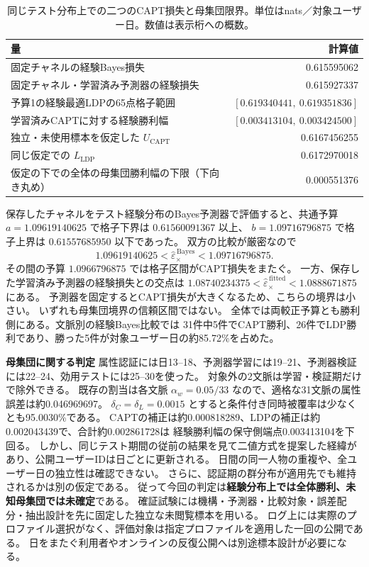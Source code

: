 \documentclass[a4paper,11pt]{ltjsarticle}
\theoremstyle{jp}
\newcommand{\para}[1]{\par\Needspace{3\baselineskip}\addvspace{.6\baselineskip}\noindent\textbf{#1}\enspace}
\begin{document}
\begin{table}[htbp]
\centering
\caption{同じテスト分布上での二つのCAPT損失と母集団限界。単位はnats／対象ユーザー日。数値は表示桁への概数。}\label{tab:audit}
\begin{tabular}{@{}lr@{}}
\toprule
量 & 計算値\\
\midrule
固定チャネルの経験Bayes損失 & 0.615595062\\
固定チャネル・学習済み予測器の経験損失 & 0.615927337\\
予算1の経験最適LDPの65点格子範囲 & \([0.619340441,\ 0.619351836]\)\\
学習済みCAPTに対する経験勝利幅 & \([0.003413104,\ 0.003424500]\)\\
\midrule
独立・未使用標本を仮定した \(U_{\mathrm{CAPT}}\) & 0.6167456255\\
同じ仮定での \(L_{\mathrm{LDP}}\) & 0.6172970018\\
仮定の下での全体の母集団勝利幅の下限（下向き丸め） & 0.000551376\\
\bottomrule
\end{tabular}
\end{table}

保存したチャネルをテスト経験分布のBayes予測器で評価すると、共通予算
\(a=1.09619140625\) で格子下界は \(0.61560091367\) 以上、
\(b=1.09716796875\) で格子上界は \(0.61557685950\) 以下であった。
双方の比較が厳密なので
\[
  \boxed{1.09619140625<\widehat\varepsilon_\times^{\,\mathrm{Bayes}}
                      <1.09716796875} .
\]
その間の予算 \(1.0966796875\) では格子区間がCAPT損失をまたぐ。
一方、保存した学習済み予測器の経験損失との交点は
\(1.08740234375<\widehat\varepsilon_\times^{\,\mathrm{fitted}}<1.0888671875\) にある。
予測器を固定するとCAPT損失が大きくなるため、こちらの境界は小さい。
いずれも母集団境界の信頼区間ではない。
全体では両較正予算とも勝利側にある。文脈別の経験Bayes比較では
31件中5件でCAPT勝利、26件でLDP勝利であり、勝った5件が対象ユーザー日の約85.72\%を占めた。

\para{母集団に関する判定}
属性認証には日13--18、予測器学習には19--21、予測器検証には22--24、効用テストには25--30を使った。
対象外の2文脈は学習・検証期だけで除外できる。
既存の割当は各文脈 \(\alpha_w=0.05/33\) なので、適格な31文脈の属性誤差は約0.046969697。
\(\delta_C=\delta_L=0.0015\) とすると条件付き同時被覆率は少なくとも95.0030\%である。
CAPTの補正は約0.000818289、LDPの補正は約0.002043439で、合計約0.002861728は
経験勝利幅の保守側端点0.003413104を下回る。
しかし、同じテスト期間の従前の結果を見て二値方式を提案した経緯があり、公開ユーザーIDは日ごとに更新される。
日間の同一人物の重複や、全ユーザー日の独立性は確認できない。
さらに、認証期の群分布が適用先でも維持されるかは別の仮定である。
従って今回の判定は\textbf{経験分布上では全体勝利、未知母集団では未確定}である。
確証試験には機構・予測器・比較対象・誤差配分・抽出設計を先に固定した独立な未閲覧標本を用いる。
ログ上には実際のプロファイル選択がなく、評価対象は指定プロファイルを適用した一回の公開である。
日をまたぐ利用者やオンラインの反復公開へは別途標本設計が必要になる。\cite{criteo}
\end{document}
